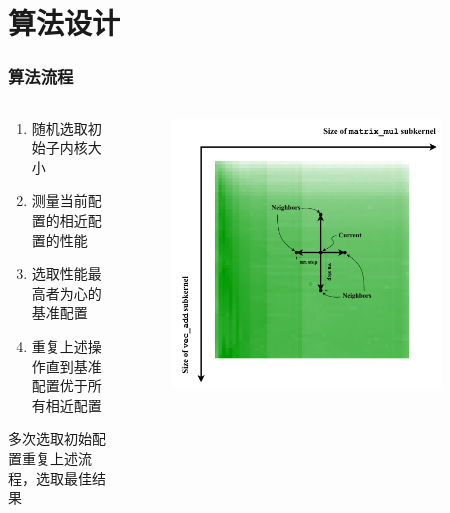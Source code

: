 \documentclass[aspectratio=169]{ctexbeamer}
\begin{document}
\section{算法设计}
\begin{frame}
  \frametitle{算法流程}
  \begin{columns}
    \begin{column}{0.5\textwidth}
      \begin{block}{}
        \indent
        \begin{enumerate}
          \item 随机选取初始子内核大小
          \item 测量当前配置的相近配置的性能
          \item 选取性能最高者为心的基准配置
          \item 重复上述操作直到基准配置优于所有相近配置
        \end{enumerate}
      \end{block}
      多次选取初始配置重复上述流程，选取最佳结果
    \end{column}
    \begin{column}{0.5\textwidth}
      \begin{figure}
        \includegraphics[width=0.9\textwidth]{figures/searching_concept.drawio.pdf}
      \end{figure}
    \end{column}
  \end{columns}
\end{frame}
\end{document}
